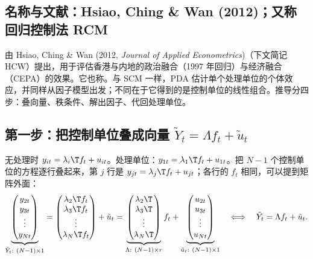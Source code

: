 \subsection{名称与文献：Hsiao, Ching \& Wan (2012)；又称回归控制法 RCM}

由 Hsiao, Ching \& Wan (2012, \emph{Journal of Applied Econometrics})（下文简记 HCW）提出，用于评估香港与内地的政治融合（1997 年回归）与经济融合（CEPA）的效果。它也称。与 SCM 一样，PDA 估计单个处理单位的个体效应，并同样从因子模型出发；不同在于它得到的是控制单位的线性组合。推导分四步：叠向量、秩条件、解出因子、代回处理单位。

\subsection{第一步：把控制单位叠成向量 \texorpdfstring{$\tilde Y_t=\Lambda f_t+\tilde u_t$}{Y\_t = Lambda f\_t + u\_t}}

无处理时 $y_{it}=\lambda_i\T f_t+u_{it}$。处理单位：$y_{1t}=\lambda_1\T f_t+u_{1t}$。把 $N-1$ 个控制单位的方程逐行叠起来，第 $j$ 行是 $y_{jt}=\lambda_j\T f_t+u_{jt}$；各行的 $f_t$ 相同，可以提到矩阵外面：
\begin{equation}\label{eq:U16-stack}
\underbrace{\begin{pmatrix}y_{2t}\\ y_{3t}\\ \vdots\\ y_{Nt}\end{pmatrix}}_{\tilde Y_t:\ (N-1)\times1}
=\begin{pmatrix}\lambda_2\T f_t\\ \lambda_3\T f_t\\ \vdots\\ \lambda_N\T f_t\end{pmatrix}+\tilde u_t
=\underbrace{\begin{pmatrix}\lambda_2\T\\ \lambda_3\T\\ \vdots\\ \lambda_N\T\end{pmatrix}}_{\Lambda:\ (N-1)\times r}f_t+\underbrace{\begin{pmatrix}u_{2t}\\ u_{3t}\\ \vdots\\ u_{Nt}\end{pmatrix}}_{\tilde u_t:\ (N-1)\times1}
\quad\Longleftrightarrow\quad \tilde Y_t=\Lambda f_t+\tilde u_t .
\end{equation}

